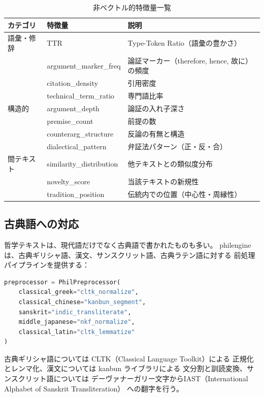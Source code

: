 \documentclass[a4paper,11pt]{ltjsarticle}
\begin{document}
\begin{table}[H]
\centering
\caption{非ベクトル的特徴量一覧}
\label{tab:features}
\small
\begin{tabular}{llp{6cm}}
\toprule
\textbf{カテゴリ} & \textbf{特徴量} & \textbf{説明} \\
\midrule
語彙・修辞 & TTR & Type-Token Ratio（語彙の豊かさ） \\
           & argument\_marker\_freq & 論証マーカー（therefore, hence, 故に）の頻度 \\
           & citation\_density & 引用密度 \\
           & technical\_term\_ratio & 専門語比率 \\
\midrule
構造的 & argument\_depth & 論証の入れ子深さ \\
       & premise\_count & 前提の数 \\
       & counterarg\_structure & 反論の有無と構造 \\
       & dialectical\_pattern & 弁証法パターン（正・反・合） \\
\midrule
間テキスト & similarity\_distribution & 他テキストとの類似度分布 \\
           & novelty\_score & 当該テキストの新規性 \\
           & tradition\_position & 伝統内での位置（中心性・周縁性） \\
\bottomrule
\end{tabular}
\end{table}

\subsection{古典語への対応}

哲学テキストは、現代語だけでなく古典語で書かれたものも多い。
philengine は、古典ギリシャ語、漢文、サンスクリット語、古典ラテン語に対する
前処理パイプラインを提供する：

\begin{lstlisting}[language=Python,caption=古典語前処理]
preprocessor = PhilPreprocessor(
    classical_greek="cltk_normalize",
    classical_chinese="kanbun_segment",
    sanskrit="indic_transliterate",
    middle_japanese="nkf_normalize",
    classical_latin="cltk_lemmatize"
)
\end{lstlisting}

古典ギリシャ語については CLTK（Classical Language Toolkit）による
正規化とレンマ化、漢文については kanbun ライブラリによる
文分割と訓読変換、サンスクリット語については
デーヴァナーガリー文字からIAST（International Alphabet of Sanskrit Transliteration）
への翻字を行う。
\end{document}
